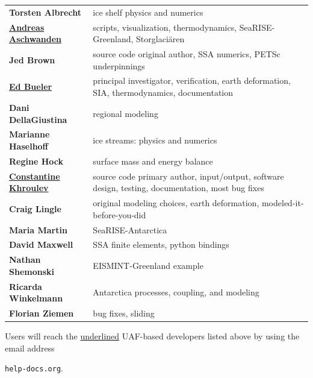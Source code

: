 \documentclass[titlepage,letterpaper,final]{scrartcl}
\begin{document}
\renewcommand{\arraystretch}{1.3}
\begin{tabular}{ll}
\textbf{Torsten Albrecht} & ice shelf physics and numerics \\
\textbf{\underline{Andreas Aschwanden}} & \begin{minipage}[t]{4in} scripts, visualization, thermodynamics, SeaRISE-Greenland, Storglaci\"aren  \end{minipage}  \\
\textbf{Jed Brown} & source code original author, SSA numerics, PETSc underpinnings \\
\textbf{\underline{Ed Bueler}} & \begin{minipage}[t]{4in} principal investigator, verification, earth deformation, SIA, thermodynamics, documentation  \end{minipage} \\
\textbf{Dani DellaGiustina} & regional modeling \\
\textbf{Marianne Haselhoff} & ice streams: physics and numerics\\
\textbf{Regine Hock} & surface mass and energy balance \\
\textbf{\underline{Constantine Khroulev}} & \begin{minipage}[t]{4in} source code primary author, input/output, software design, testing, documentation, most bug fixes \end{minipage} \\
\textbf{Craig Lingle}\index{People!Lingle, Craig} & original modeling choices, earth deformation, modeled-it-before-you-did \\
\textbf{Maria Martin} & SeaRISE-Antarctica \\
\textbf{David Maxwell} & SSA finite elements, python bindings \\
\textbf{Nathan Shemonski} & EISMINT-Greenland example \\
\textbf{Ricarda Winkelmann} & Antarctica processes, coupling, and modeling  \\
\textbf{Florian Ziemen} & bug fixes, sliding \\
\end{tabular}

\bigskip\bigskip
Users will reach the \underline{underlined} UAF-based developers listed above by using the email address

\centerline{ \texttt{help\@@pism-docs.org}.  }

\vfill
\end{document}

